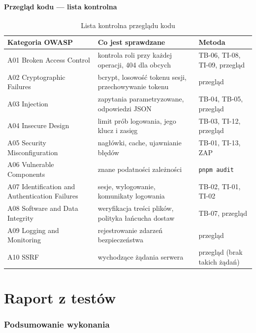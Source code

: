 \documentclass[a4paper,11pt]{article}
\newcommand{\code}[1]{\texttt{\small #1}}
\begin{document}
\subsection{Przegląd kodu — lista kontrolna}
\begin{table}[H]
\centering\small
\begin{tabularx}{\textwidth}{@{}l L l@{}}
\toprule
\textsf{\textbf{Kategoria OWASP}} & \textsf{\textbf{Co jest sprawdzane}} & \textsf{\textbf{Metoda}}\\
\midrule
A01 Broken Access Control & kontrola roli przy każdej operacji, 404 dla obcych & TB-06, TI-08, TI-09, przegląd\\
A02 Cryptographic Failures & bcrypt, losowość tokenu sesji, przechowywanie tokenu & przegląd\\
A03 Injection & zapytania parametryzowane, odpowiedzi JSON & TB-04, TB-05, przegląd\\
A04 Insecure Design & limit prób logowania, jego klucz i zasięg & TB-03, TI-12, przegląd\\
A05 Security Misconfiguration & nagłówki, cache, ujawnianie błędów & TB-01, TI-13, ZAP\\
A06 Vulnerable Components & znane podatności zależności & \code{pnpm audit}\\
A07 Identification and Authentication Failures & sesje, wylogowanie, komunikaty logowania & TB-02, TI-01, TI-02\\
A08 Software and Data Integrity & weryfikacja treści plików, polityka łańcucha dostaw & TB-07, przegląd\\
A09 Logging and Monitoring & rejestrowanie zdarzeń bezpieczeństwa & przegląd\\
A10 SSRF & wychodzące żądania serwera & przegląd (brak takich żądań)\\
\bottomrule
\end{tabularx}
\caption{Lista kontrolna przeglądu kodu}
\end{table}

\part{Raport z testów}

\section{Podsumowanie wykonania}
\end{document}
